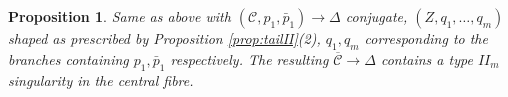 \documentclass{compositio}
\newcommand{\PP}{\mathbb P}
\renewcommand{\to}{\rightarrow}
\newcommand{\dvr}{\Delta}
\theoremstyle{plain}
\newtheorem{prop}[thm]{Proposition}
\theoremstyle{definition}
\theoremstyle{remark}
\begin{document}
\begin{prop}\label{prop:contractionII}
 Same as above with $(\mathcal C,p_1,\bar p_1)\to \Delta$ conjugate, $(Z,q_1,\ldots,q_m)$ shaped as prescribed by Proposition \ref{prop:tailII}(2), $q_1,q_m$ corresponding to the branches containing $p_1,\bar p_1$ respectively. The resulting $\overline{\mathcal C}\to\dvr$ contains a type $I\!I_m$ singularity in the central fibre.
\end{prop}

\end{document}
